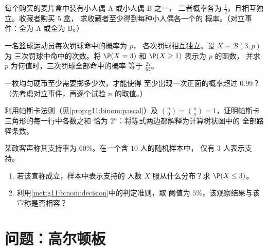 \begin{exercise}[$\star\star$]\label{exo:g11:binom:7}
每个购买的麦片盒中装有小人偶 A 或小人偶 B 之一，
二者概率各为 $\frac12$，且相互独立。收藏者购买 $5$ 盒，
求收藏者至少得到每种小人偶各一个的
概率。（对立事件：全为 A 或全为 B。）
\end{exercise}

\begin{exercise}[$\star\star$]\label{exo:g11:binom:8}
一名篮球运动员每次罚球命中的概率为 $p$，
各次罚球相互独立。设 $X \sim \mathcal B(3, p)$ 为
三次罚球中命中的次数。将 $\P(X = 3)$ 和 $\P(X \geq 1)$ 表示为 $p$ 的函数，
并求 $p$ 为何值时，三次罚球全部命中的概率
等于 $\frac{27}{64}$。
\end{exercise}

\begin{exercise}[$\star\star$]\label{exo:g11:binom:9}
一枚均匀硬币至少需要掷多少次，才能使得
至少出现一次正面的概率超过 $0.99$？（先考虑对立事件，再逐个试验
$n$ 的取值。）
\end{exercise}

\begin{exercise}[$\star\star$]\label{exo:g11:binom:10}
利用帕斯卡法则（见\cref{prop:g11:binom:pascal}）及
$\binom n0 = \binom nn = 1$，证明帕斯卡三角形的每一行中各数之和
恰为 $2^n$：将等式两边都解释为计算树状图中的
全部路径条数。
\end{exercise}

\begin{exercise}[$\star\star\star$]\label{exo:g11:binom:11}
某政客声称其支持率为 $60\%$。在一个含 $10$ 人的随机样本中，
仅有 $3$ 人表示支持。
\begin{enumerate}
  \item 若该宣称成立，样本中表示支持的
        人数 $X$ 服从什么分布？求 $\P(X \leq 3)$。
  \item 利用\cref{met:g11:binom:decision}中的判定准则，取
        阈值为 $5\%$，该观察结果与该宣称是否相容？
\end{enumerate}
\end{exercise}

\section{问题：高尔顿板}

